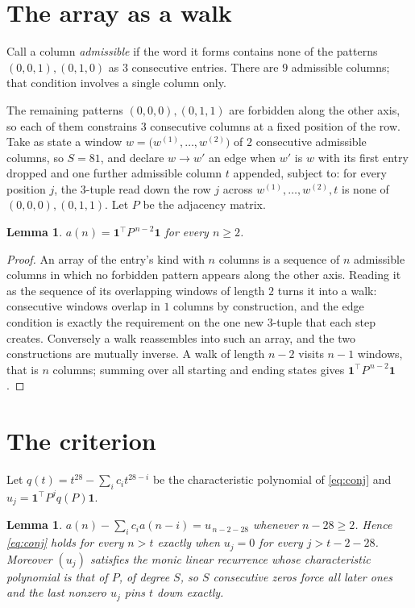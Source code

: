 \documentclass[11pt,a4paper]{article}
\theoremstyle{plain}
\newtheorem{lemma}[theorem]{Lemma}
\theoremstyle{definition}
\begin{document}
\section{The array as a walk}

Call a column \emph{admissible} if the word it forms contains none of the patterns
$(0,0,1), (0,1,0)$ as $3$ consecutive entries. There are $9$ admissible columns; that condition
involves a single column only.

The remaining patterns $(0,0,0), (0,1,1)$ are forbidden along the other axis, so each of them
constrains $3$ consecutive columns at a fixed position of the row. Take as state a
window $w=\bigl(w^{(1)},\dots,w^{(2)}\bigr)$ of $2$ consecutive admissible
columns, so $S=81$, and declare $w\to w'$ an edge when $w'$ is $w$ with its first entry
dropped and one further admissible column $t$ appended, subject to: for every position
$j$, the $3$-tuple read down the row $j$ across $w^{(1)},\dots,w^{(2)},t$
is none of $(0,0,0), (0,1,1)$. Let $P$ be the adjacency matrix.

\begin{lemma}\label{lem:walk}
$a(n)=\mathbf{1}^{\!\top}P^{\,n-2}\mathbf{1}$ for every $n\ge2$.
\end{lemma}

\begin{proof}
An array of the entry's kind with $n$ columns is a sequence of $n$ admissible columns in
which no forbidden pattern appears along the other axis. Reading it as the sequence of its
overlapping windows of length $2$ turns it into a walk: consecutive windows overlap in
$1$ columns by construction, and the edge condition is exactly the requirement on the one
new $3$-tuple that each step creates. Conversely a walk reassembles into such an array,
and the two constructions are mutually inverse. A walk of length $n-2$ visits $n-1$
windows, that is $n$ columns; summing over all starting and ending states gives
$\mathbf{1}^{\!\top}P^{\,n-2}\mathbf{1}$.
\end{proof}

\section{The criterion}

Let $q(t)=t^{28}-\sum_i c_i t^{28-i}$ be the characteristic polynomial of
\eqref{eq:conj} and $u_j=\mathbf{1}^{\!\top}P^{j}q(P)\mathbf{1}$.

\begin{lemma}\label{lem:crit}
$a(n)-\sum_i c_i a(n-i)=u_{\,n-2-28}$ whenever $n-28\ge2$. Hence
\eqref{eq:conj} holds for every $n>t$ exactly when $u_j=0$ for every
$j>t-2-28$. Moreover $(u_j)$ satisfies the monic linear recurrence whose
characteristic polynomial is that of $P$, of degree $S$, so $S$ consecutive zeros force all
later ones and the last nonzero $u_j$ pins $t$ down exactly.
\end{lemma}
\end{document}
